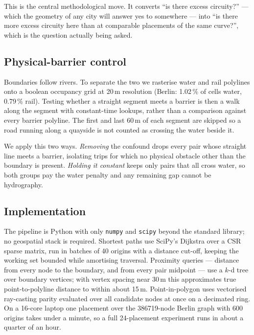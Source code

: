 \documentclass[11pt,a4paper]{article}
\begin{document}
This is the central methodological move. It converts ``is there excess
circuity?'' --- which the geometry of any city will answer yes to somewhere ---
into ``is there more excess circuity here than at comparable placements of the
same curve?'', which is the question actually being asked.

\subsection{Physical-barrier control}\label{sec:barriers}

Boundaries follow rivers. To separate the two we rasterise water and rail
polylines onto a boolean occupancy grid at 20\,m resolution
(Berlin: 1.02\,\% of cells water, 0.79\,\%
rail). Testing whether a straight segment meets a barrier is then a walk along
the segment with constant-time lookups, rather than a comparison against every
barrier polyline. The first and last 60\,m of each segment are skipped so a road
running along a quayside is not counted as crossing the water beside it.

We apply this two ways. \emph{Removing} the confound drops every pair whose
straight line meets a barrier, isolating trips for which no physical obstacle
other than the boundary is present. \emph{Holding it constant} keeps only pairs
that all cross water, so both groups pay the water penalty and any remaining gap
cannot be hydrography.

\subsection{Implementation}

The pipeline is Python with only \texttt{numpy} and \texttt{scipy} beyond the
standard library; no geospatial stack is required. Shortest paths use SciPy's
Dijkstra over a CSR sparse matrix, run in batches of 40 origins with a distance
cut-off, keeping the working set bounded while amortising traversal. Proximity
queries --- distance from every node to the boundary, and from every pair
midpoint --- use a $k$-d tree over boundary vertices; with vertex spacing near
30\,m this approximates true point-to-polyline distance to within about 15\,m.
Point-in-polygon uses vectorised ray-casting parity evaluated over all candidate
nodes at once on a decimated ring. On a 16-core laptop one placement over the
386719-node Berlin graph with 600 origins takes under a
minute, so a full 24-placement experiment runs in about a quarter of an hour.
\end{document}
